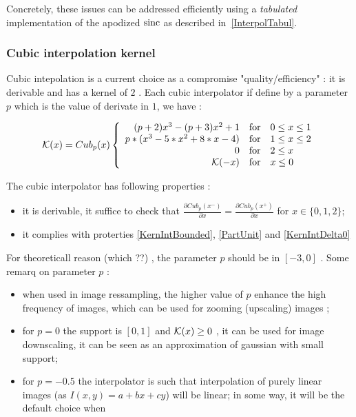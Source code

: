 Concretely, these issues can be addressed efficiently  using a \emph{tabulated} implementation
of the apodized $\operatorname{sinc}$ as described in~\ref{InterpolTabul}.



\subsubsection{Cubic interpolation kernel}

\label{CubicInterpol}



Cubic intepolation is a current choice as a compromise "quality/efficiency" : it is derivable and has a kernel of $2$ .
Each cubic interpolator if define by a parameter $p$ which is the value of derivate in $1$, we have :

\begin{equation}
\mathcal K(x) = Cub_p(x)
\left\{ \begin{array}{rcl}
(p+2 ) x^3 -(p+3)x^2+1        &   \mbox{for} &  0 \leq x \leq 1 \\ 
p*(x^3 - 5 * x^2 + 8* x -4)   &   \mbox{for} &  1 \leq x \leq 2 \\
0                             &   \mbox{for} &  2 \leq x \\
\mathcal K(-x)                    &   \mbox{for} &   x \leq 0 \\
\end{array}\right.
\end{equation}


The cubic interpolator has following properties :

\begin{itemize}
    \item  it is derivable, it suffice to check that $\frac{\partial Cub_p(x^-)}{\partial x} = \frac{\partial Cub_p(x ^+)}{\partial x} $  
           for $x \in \{0,1,2\}$;
    \item  it complies with proterties \ref{KernIntBounded},   \ref{PartUnit} and \ref{KernIntDelta0}  
\end{itemize}


For theoreticall reason (which ??) , the parameter $p$ should be in $[-3,0]$ . Some remarq on parameter $p$ :

\begin{itemize}
    \item  when used in image ressampling, the higher value of  $p$ enhance the high frequency of images, which can be used
           for zooming (upscaling) images ;

    \item  for  $p=0$  the support is $[0,1]$ and $\mathcal K(x) \geq 0$ , it can be used for image downscaling,
           it can be seen as an approximation of gaussian with small support;

    \item  for  $p= -0.5$  the interpolator  is such that interpolation of purely linear images (as $I(x,y)=a+bx+cy$)
           will  be linear; in some way, it will be the default choice when 
\end{itemize}

